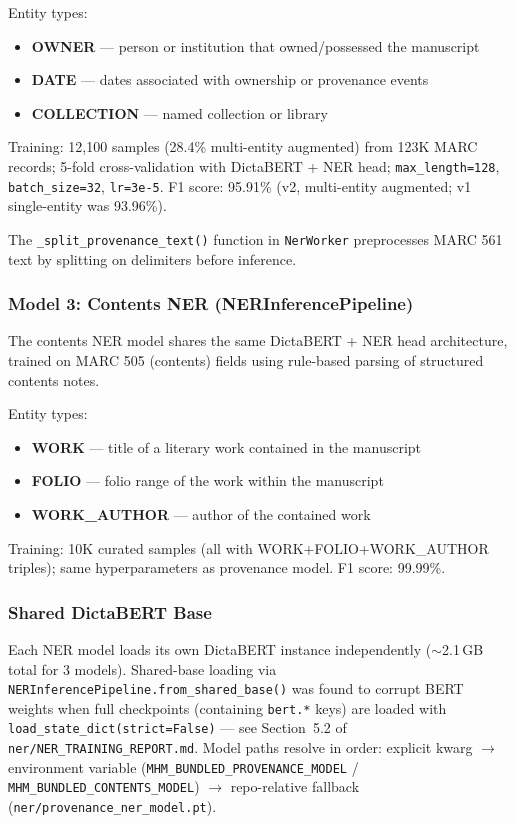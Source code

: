 \documentclass[12pt]{article}
\newcommand{\filepath}[1]{\texttt{\small #1}}
\newcommand{\code}[1]{\texttt{#1}}
\begin{document}
Entity types:
\begin{itemize}
\item \textbf{OWNER} --- person or institution that owned/possessed the manuscript
\item \textbf{DATE} --- dates associated with ownership or provenance events
\item \textbf{COLLECTION} --- named collection or library
\end{itemize}

Training: 12,100 samples (28.4\% multi-entity augmented) from 123K MARC records; 5-fold cross-validation with DictaBERT + NER head; \code{max\_length=128}, \code{batch\_size=32}, \code{lr=3e-5}. F1 score: 95.91\% (v2, multi-entity augmented; v1 single-entity was 93.96\%).

The \code{\_split\_provenance\_text()} function in \code{NerWorker} preprocesses MARC 561 text by splitting on delimiters before inference.

\subsubsection{Model 3: Contents NER (NERInferencePipeline)}

The contents NER model shares the same DictaBERT + NER head architecture, trained on MARC 505 (contents) fields using rule-based parsing of structured contents notes.

Entity types:
\begin{itemize}
\item \textbf{WORK} --- title of a literary work contained in the manuscript
\item \textbf{FOLIO} --- folio range of the work within the manuscript
\item \textbf{WORK\_AUTHOR} --- author of the contained work
\end{itemize}

Training: 10K curated samples (all with WORK+FOLIO+WORK\_AUTHOR triples); same hyperparameters as provenance model. F1 score: 99.99\%.

\subsubsection{Shared DictaBERT Base}

Each NER model loads its own DictaBERT instance independently ($\sim$2.1\,GB total for 3 models). Shared-base loading via \code{NERInferencePipeline.from\_shared\_base()} was found to corrupt BERT weights when full checkpoints (containing \code{bert.*} keys) are loaded with \code{load\_state\_dict(strict=False)} --- see Section~5.2 of \filepath{ner/NER\_TRAINING\_REPORT.md}. Model paths resolve in order: explicit kwarg $\to$ environment variable (\code{MHM\_BUNDLED\_PROVENANCE\_MODEL} / \code{MHM\_BUNDLED\_CONTENTS\_MODEL}) $\to$ repo-relative fallback (\filepath{ner/provenance\_ner\_model.pt}).
\end{document}

